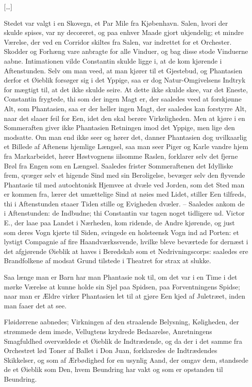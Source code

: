 \documentclass[12pt,a4paper]{article}
\begin{document}
[…]

Stedet var valgt i en Skovegn, et Par Mile fra Kjøbenhavn. Salen, hvori der skulde spises, var ny decoreret, og paa enhver Maade gjort ukjendelig; et mindre Værelse, der ved en Corridor skiltes fra Salen, var indrettet for et Orchester. Skodder og Forhæng vare anbragte for alle Vinduer, og bag disse stode Vinduerne aabne. Intimationen vilde Constantin skulde ligge i, at de kom kjørende i Aftenstunden. Selv om man veed, at man kjører til et Gjestebud, og Phantasien derfor et Øieblik forsøger sig i det Yppige, saa er dog Natur-Omgivelsens Indtryk for mægtigt til, at det ikke skulde seire. At dette ikke skulde skee, var det Eneste, Constantin frygtede, thi som der ingen Magt er, der saaledes veed at forskjønne Alt, som Phantasien, saa er der heller ingen Magt, der saaledes kan forstyrre Alt, naar det slaaer feil for Een, idet den skal berøre Virkeligheden. Men at kjøre i en Sommeraften giver ikke Phantasien Retningen imod det Yppige, men lige den modsatte. Om man end ikke seer og hører det, danner Phantasien dog uvilkaarlig et Billede af Aftenens hjemlige Længsel, saa man seer Piger og Karle vandre hjem fra Markarbeidet, hører Høstvognens iilsomme Raslen, forklarer selv det fjerne Brøl fra Engen som en Længsel. Saaledes frister Sommeraftenen det Idylliske frem, qvæger selv et higende Sind med sin Beroligelse, bevæger selv den flyvende Phantasie til med autochtonisk Hjemvee at dvæle ved Jorden, som det Sted man er kommen fra, lærer det umættelige Sind at nøies med Lidet, stiller Een tilfreds, thi i Aftenstunden staaer Tiden stille og Evigheden dvæler. – Saaledes ankom de i Aftenstunden: de Indbudne; thi Constantin var tagen noget tidligere ud. Victor E., der laae paa Landet i Nærheden, kom ridende, de Andre kjørende, og just som deres Vogn kjørte til Siden, svingede en holsteensk Vogn ind ad Porten: et lystigt Compagnie af fire Haandværkssvende, hvilke bleve beværtede for dernæst i det afgjørende Øieblik at haves i Beredskab som et Nedrivningscorps: saaledes ere Brandfolkene af modsat Grund tilstede i Theatret for strax at slukke.

Saa længe man er Barn har man Phantasie nok til, om det var i en Time i det mørke Værelse at kunne holde sin Sjel paa Spidsen, paa Forventningens Spidse; naar man er Ældre virker Phantasien let til at gjøre Een kjed af Juletræet, inden man faaer det at see.

Fløidørrene aabnedes; Virkningen af den straalende Belysning, Køligheden, der strømmede dem imøde, Vellugtens krydrede Bedaarelse, Anretningens Smagfuldhed overvældede et Øieblik de Indtrædende, og da der i det samme fra Orchestret lød Toner af Ballet i Don Juan, forklaredes de Indtrædendes Skikkelser, og som af Ærbødighed for en usynlig Aand, der omgav dem, standsede de et Øieblik som Den, hvem Beundring har vakt og som er opstanden til Beundring.
\end{document}
